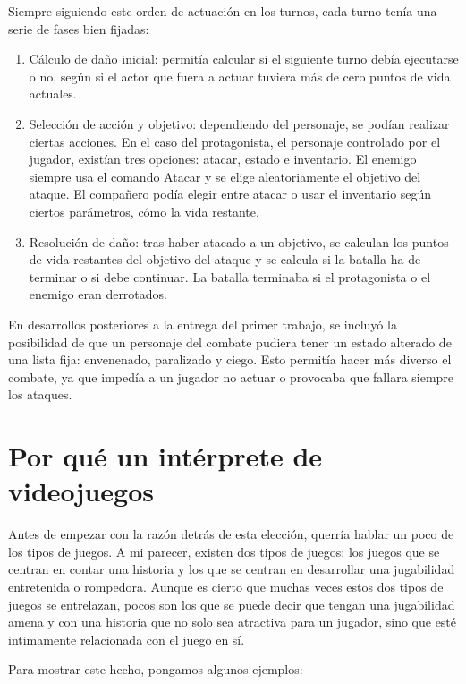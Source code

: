 Siempre siguiendo este orden de actuación en los turnos, cada turno tenía una serie de fases bien fijadas:
\begin{enumerate}
	\item Cálculo de daño inicial: permitía calcular si el siguiente turno debía ejecutarse o no, según si el actor que fuera a actuar tuviera más de cero puntos de vida actuales.
	\item Selección de acción y objetivo: dependiendo del personaje, se podían realizar ciertas acciones. En el caso del protagonista, el personaje controlado por el jugador, existían tres opciones: atacar, estado e inventario. El enemigo siempre usa el comando Atacar y se elige aleatoriamente el objetivo del ataque. El compañero podía elegir entre atacar o usar el inventario según ciertos parámetros, cómo la vida restante.
	\item Resolución de daño: tras haber atacado a un objetivo, se calculan los puntos de vida restantes del objetivo del ataque y se calcula si la batalla ha de terminar o si debe continuar. La batalla terminaba si el protagonista o el enemigo eran derrotados.
\end{enumerate} 
	
En desarrollos posteriores a la entrega del primer trabajo, se incluyó la posibilidad de que un personaje del combate pudiera tener un estado alterado de una lista fija: envenenado, paralizado y ciego.
Esto permitía hacer más diverso el combate, ya que impedía a un jugador no actuar o provocaba que fallara siempre los ataques.

\section{Por qué un intérprete de videojuegos}

Antes de empezar con la razón detrás de esta elección, querría hablar un poco de los tipos de juegos. A mi parecer, existen dos tipos de juegos: los juegos que se centran en contar una historia y los que se centran en desarrollar una jugabilidad entretenida o rompedora. Aunque es cierto que muchas veces estos dos tipos de juegos se entrelazan, pocos son los que se puede decir que tengan una jugabilidad amena y con una historia que no solo sea atractiva para un jugador, sino que esté intimamente relacionada con el juego en sí.

Para mostrar este hecho, pongamos algunos ejemplos:

